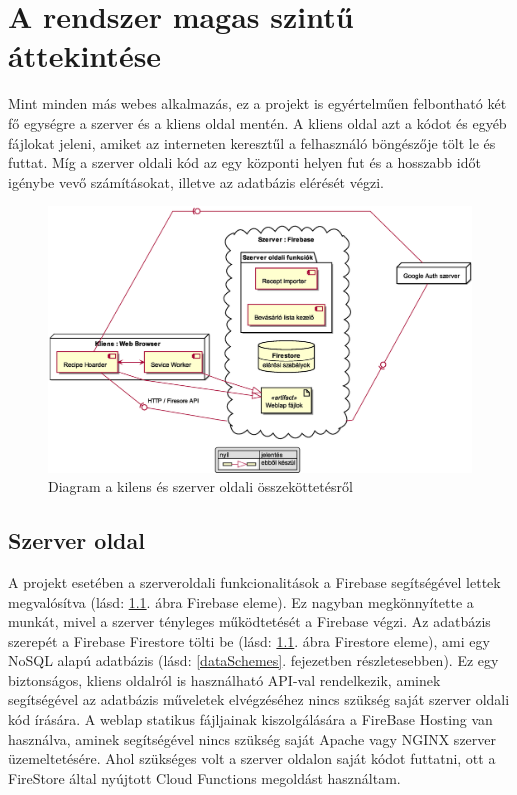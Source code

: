 \documentclass[12pt]{report}
\theoremstyle{definition}
\begin{document}
\chapter{A rendszer magas szintű áttekintése}
\label{systemExplanation}
Mint minden más webes alkalmazás, ez a projekt is egyértelműen felbontható két fő egységre a szerver és a kliens oldal mentén. 
A kliens oldal azt a kódot és egyéb fájlokat jeleni, amiket az interneten keresztűl a felhasználó böngészője tölt le és futtat. 
Míg a szerver oldali kód az egy központi helyen fut és a hosszabb időt igénybe vevő számításokat, illetve az adatbázis elérését végzi.

\noindent
\begin{figure}[H]
	\centering
	\includegraphics[width=\textwidth]{out/diagrams/deployment/deployment.eps}
	\caption{Diagram a kilens és szerver oldali összeköttetésről}
    \label{fig:deployment}
\end{figure}

\section{Szerver oldal}
A projekt esetében a szerveroldali funkcionalitások a Firebase segítségével lettek megvalósítva (lásd: \ref{fig:deployment}. ábra Firebase eleme). 
Ez nagyban megkönnyítette a munkát, mivel a szerver tényleges működtetését a Firebase végzi. 
Az adatbázis szerepét a Firebase Firestore tölti be (lásd: \ref{fig:deployment}.  ábra Firestore eleme), ami egy NoSQL alapú adatbázis (lásd: \ref{dataSchemes}. fejezetben részletesebben).  Ez egy biztonságos, kliens oldalról is használható API-val rendelkezik, aminek segítségével az adatbázis műveletek elvégzéséhez nincs szükség saját szerver oldali kód írására. A weblap statikus fájljainak kiszolgálására a FireBase Hosting van használva, aminek segítségével nincs szükség saját \Gls{Apache} vagy \Gls{NGINX} szerver üzemeltetésére. Ahol szükséges volt a szerver oldalon saját kódot futtatni, ott a FireStore által nyújtott Cloud Functions megoldást használtam.
\end{document}
